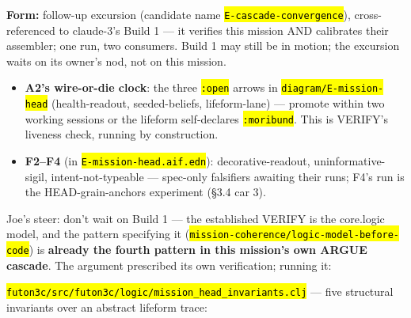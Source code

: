 \documentclass[11pt,oneside]{article}
\newcommand{\scopehl}[1]{\texttt{\hl{#1}}}
\begin{document}
\begin{phasebox}[title={5. VERIFY (opened 2026-06-10) --- two derivations of one argument}]
\begin{subbox}[title={V1 --- the convergence probe (the centerpiece; per combining-methods-as-diagnostic)}]
\textbf{Form:} follow-up excursion (candidate name \scopehl{E-cascade-convergence}),
cross-referenced to claude-3's Build 1 --- it verifies this mission AND
calibrates their assembler; one run, two consumers. Build 1 may still be in
motion; the excursion waits on its owner's nod, not on this mission.

\end{subbox}
\begin{subbox}[title={V2 --- the standing obligations (already armed)}]

\begin{itemize}[leftmargin=1.2em,itemsep=1pt]
\item \textbf{A2's wire-or-die clock}: the three \scopehl{:open} arrows in \scopehl{diagram/E-mission-head} (health-readout, seeded-beliefs, lifeform-lane) --- promote within two working sessions or the lifeform self-declares \scopehl{:moribund}. This is VERIFY's liveness check, running by construction.
\item \textbf{F2--F4} (in \scopehl{E-mission-head.aif.edn}): decorative-readout, uninformative-sigil, intent-not-typeable --- spec-only falsifiers awaiting their runs; F4's run is the HEAD-grain-anchors experiment (\S{}3.4 car 3).
\end{itemize}

\end{subbox}
\begin{subbox}[title={V0 --- the logic model: VERIFIED (2026-06-10)}]

Joe's steer: don't wait on Build 1 --- the established VERIFY is the core.logic
model, and the pattern specifying it (\scopehl{mission-coherence/logic-model-before-code})
is \textbf{already the fourth pattern in this mission's own ARGUE cascade}. The
argument prescribed its own verification; running it:

\scopehl{futon3c/src/futon3c/logic/mission\_head\_invariants.clj} --- five structural
invariants over an abstract lifeform trace:


\end{subbox}
\end{phasebox}
\end{document}
